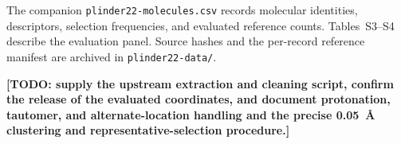The companion \texttt{plinder22-molecules.csv} records molecular identities, descriptors,
selection frequencies, and evaluated reference counts. Tables~S3--S4 describe the
evaluation panel.
Source hashes and the per-record reference manifest are archived in \texttt{plinder22-data/}.

\clearpage


\textbf{[TODO: supply the upstream extraction and cleaning script, confirm the release of
the evaluated coordinates, and document protonation, tautomer, and alternate-location
handling and the precise 0.05~\AA{} clustering and representative-selection procedure.]}
